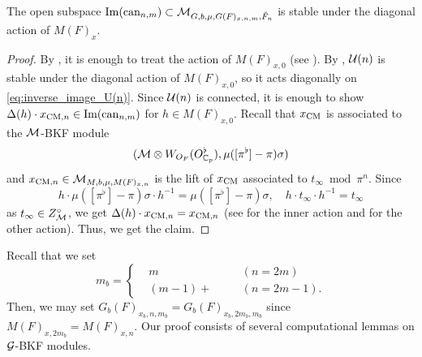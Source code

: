 \documentclass[12pt,reqno]{amsart}
\begin{document}
\begin{prop} \label{prop:stability_under_diagonal_action}
    The open subspace ${\operatorname{Im}}({\operatorname{can}}_{n, m}) \subset {\mathcal{M}}_{G, b, \mu, G(F)_{x, n, m}, \breve{F}_n}$ is stable under the diagonal action of $M(F)_x$. 
\end{prop}
\begin{proof}
    By , it is enough to treat the action of $M(F)_{x, 0}$ (see ). By , ${\mathcal{U}}(n)$ is stable under the diagonal action of $M(F)_{x, 0}$, so it acts diagonally on \eqref{eq:inverse_image_U(n)}. Since ${\mathcal{U}}(n)$ is connected, it is enough to show $\Delta(h) \cdot x_{{\operatorname{CM}}, n} \in {\operatorname{Im}}({\operatorname{can}}_{n, m})$ for $h \in M(F)_{x, 0}$. Recall that $x_{\operatorname{CM}}$ is associated to the ${\mathcal{M}}$-BKF module
    \[
        ({\mathcal{M}} \otimes W_{O_F}(O_{\mathbb{C}_p}^\flat), \mu([\pi^\flat]-\pi)\sigma)
    \]
    and $x_{{\operatorname{CM}}, n} \in {\mathcal{M}}_{M, b, \mu, M(F)_{x, n}}$ is the lift of $x_{\operatorname{CM}}$ associated to $t_\infty \bmod \pi^n$. Since 
    \[
        h \cdot \mu([\pi^\flat]-\pi)\sigma \cdot h^{-1} = \mu([\pi^\flat]-\pi)\sigma ,\quad 
        h \cdot t_\infty \cdot h^{-1} = t_\infty
    \]
    as $t_\infty \in Z_{{\mathcal{M}}}^\circ$, we get $\Delta(h) \cdot x_{{\operatorname{CM}}, n} = x_{{\operatorname{CM}}, n}$ (see \cite[Proposition 2.15]{Tak25z} for the inner action and  for the other action). Thus, we get the claim. 
\end{proof}

Recall that we set
\[
    m_b = \left\{ \begin{alignedat}{4}
        & m & \quad & (n = 2m) \\
        & (m - 1)+ & \quad & (n = 2m - 1). 
    \end{alignedat}
    \right.
\]
Then, we may set $G_b(F)_{x_b, n, m_b} = G_b(F)_{x_b, 2m_b, m_b}$ since $M(F)_{x, 2m_b} = M(F)_{x, n}$. Our proof consists of several computational lemmas on ${\mathcal{G}}$-BKF modules. 
\end{document}

